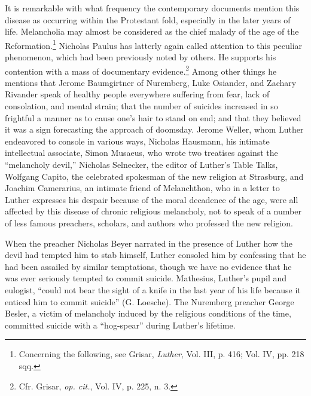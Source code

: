 It is remarkable with what frequency the contemporary documents
mention this disease as occurring within the Protestant fold, especially
in the later years of life. Melancholia may almost be considered as
the chief malady of the age of the Reformation.\footnote
{Concerning the following, see Grisar, \textit{Luther}, Vol. III, p. 416; Vol. IV, pp. 218 sqq.}
Nicholas Paulus
has latterly again called attention to this peculiar phenomenon, which
had been previously noted by others. He supports his contention with
a mass of documentary evidence.\footnote{Cfr. Grisar, \textit{op. cit.}, Vol. IV, p. 225, n. 3.}
Among other things he mentions
that Jerome Baumgirtner of Nuremberg, Luke Osiander, and Zachary
Rivander speak of healthy people everywhere suffering from
fear, lack of consolation, and mental strain; that the number of
suicides increased in so frightful a manner as to cause one’s hair to
stand on end; and that they believed it was a sign forecasting the
approach of doomsday. Jerome Weller, whom Luther endeavored to
console in various ways, Nicholas Hausmann, his intimate intellectual
associate, Simon Musaeus, who wrote two treatises against the
“melancholy devil,” Nicholas Selnecker, the editor of Luther’s Table
Talks, Wolfgang Capito, the celebrated spokesman of the new religion
at Strasburg, and Joachim Camerarius, an intimate friend of
Melanchthon, who in a letter to Luther expresses his despair because
of the moral decadence of the age, were all affected by this disease
of chronic religious melancholy, not to speak of a number of less
famous preachers, scholars, and authors who professed the new religion.

When the preacher Nicholas Beyer narrated in the presence of
Luther how the devil had tempted him to stab himself, Luther consoled
him by confessing that he had been assailed by similar temptations, though
we have no evidence that he was ever seriously tempted
to commit suicide. Mathesius, Luther’s pupil and eulogist, “could not
bear the sight of a knife in the last year of his life because it enticed
him to commit suicide” (G. Loesche). The Nuremberg preacher
George Besler, a victim of melancholy induced by the religious conditions
of the time, committed suicide with a “hog-spear” during
Luther’s lifetime.

